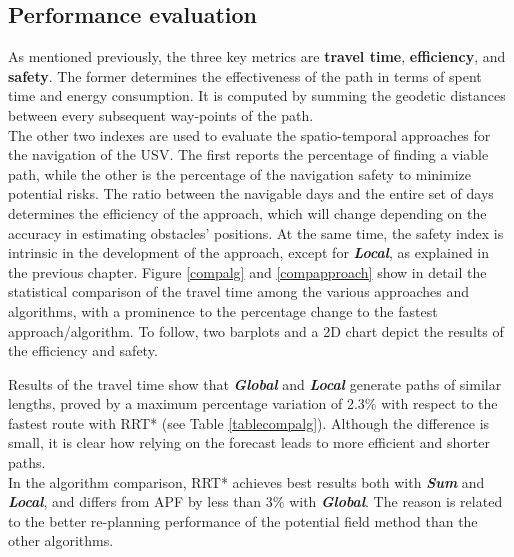 \subsection{Performance evaluation}
As mentioned previously, the three key metrics are \textbf{travel time}, \textbf{efficiency}, and \textbf{safety}. The former determines the effectiveness of the path in terms of spent time and energy consumption. It is computed by summing the geodetic distances between every subsequent way-points of the path. \\
The other two indexes are used to evaluate the spatio-temporal approaches for the navigation of the USV. The first reports the percentage of finding a viable path, while the other is the percentage of the navigation safety to minimize potential risks. The ratio between the navigable days and the entire set of days determines the efficiency of the approach, which will change depending on the accuracy in estimating obstacles' positions. At the same time, the safety index is intrinsic in the development of the approach, except for \textbf{\textit{Local}}, as explained in the previous chapter. 
Figure \ref{compalg} and \ref{compapproach} show in detail the statistical comparison of the travel time among the various approaches and algorithms, with a prominence to the percentage change to the fastest approach\slash algorithm. To follow, two barplots and a 2D chart depict the results of the efficiency and safety. 

Results of the travel time show that \textbf{\textit{Global}} and \textbf{\textit{Local}} generate paths of similar lengths, proved by a maximum percentage variation of 2.3\% with respect to the fastest route with RRT* (see Table \ref{tablecompalg}). Although the difference is small, it is clear how relying on the forecast leads to more efficient and shorter paths.\\
In the algorithm comparison, RRT* achieves best results both with \textbf{\textit{Sum}} and \textbf{\textit{Local}}, and differs from APF by less than 3\% with \textbf{\textit{Global}}. The reason is related to the better re-planning performance of the potential field method than the other algorithms.  

